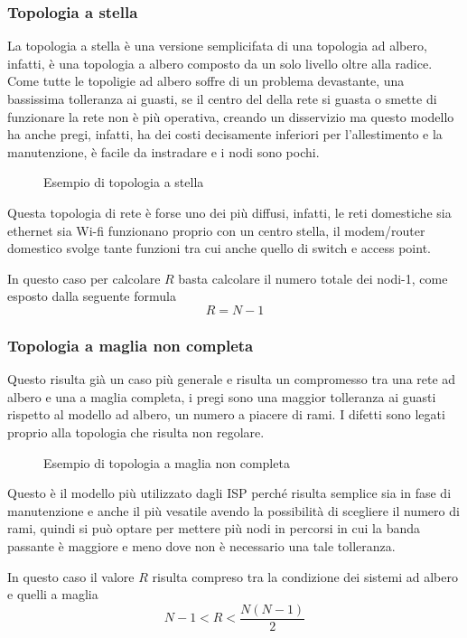 \subsubsection{Topologia a stella}
\label{sec:topastellaegrafo}
La topologia a stella è una versione semplicifata di una topologia ad albero,
infatti, è una topologia a albero composto da un solo livello oltre alla radice.
Come tutte le topoligie ad albero soffre di un problema devastante, una bassissima
tolleranza ai guasti, se il centro del della rete si guasta o smette di funzionare
la rete non è più operativa, creando un disservizio ma questo modello ha anche pregi,
infatti, ha dei costi decisamente inferiori per l'allestimento e la manutenzione,
è facile da instradare e i nodi sono pochi.
\begin{figure}[ht]
  \centering
  
  \caption{Esempio di topologia a stella}
  \label{fig:stellaesempio}
\end{figure}

\begin{oss}
  Questa topologia di rete è forse uno dei più diffusi, infatti, le reti domestiche sia
  ethernet sia Wi-fi funzionano proprio con un centro stella, il modem/router domestico
  svolge tante funzioni tra cui anche quello di switch e access point.
\end{oss}
In questo caso per calcolare $R$ basta calcolare il numero totale dei nodi-1, come
esposto dalla seguente formula
\begin{equation}
  \label{eq:stella}
  R=N-1
\end{equation}

\subsubsection{Topologia a maglia non completa}
\label{sec:topologiaamaglianoncompleta}
Questo risulta già un caso più generale e risulta un compromesso
tra una rete ad albero e una a maglia completa, i pregi sono una maggior
tolleranza ai guasti rispetto al modello ad albero, un numero a piacere di
rami. I difetti sono legati proprio alla topologia che risulta non regolare.
\begin{figure}[ht]
  \centering
  
  \caption{Esempio di topologia a maglia non completa}
  \label{fig:topologiaamagliacompletanoncomp}
\end{figure}
\begin{oss}
  Questo è il modello più utilizzato dagli ISP perché risulta semplice sia in fase
  di manutenzione e anche il più vesatile avendo la possibilità di scegliere il numero
  di rami, quindi si può optare per mettere più nodi in percorsi in cui la banda
  passante è maggiore e meno dove non è necessario una tale tolleranza.
\end{oss}
In questo caso il valore $R$ risulta compreso tra la condizione dei sistemi ad albero e
quelli a maglia
\begin{equation}
  \label{eq:maglianoncompleta}
  N-1 < R < \frac{N(N-1)}{2}
\end{equation}
\clearpage
